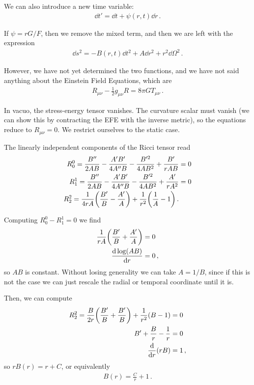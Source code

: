 \documentclass[main.tex]{subfiles}
\begin{document}
We can also introduce a new time variable: 
%
\begin{align}
\dd{t'} = \dd{t} + \psi (r, t) \dd{r} 
\,.
\end{align}

If \(\psi = r G / F\), then we remove the mixed term, and then we are left with the expression 
%
\begin{align}
\dd{s^2} = -B (r, t) \dd{t^2} + A \dd{r^2} + r^2 \dd{\Omega^2}
\,.
\end{align}

However, we have not yet determined the two functions, and we have not said anything about the Einstein Field Equations, which are 
%
\begin{align}
R_{\mu \nu } - \frac{1}{2} g_{\mu \nu } R = 8 \pi G T_{\mu \nu }
\,.
\end{align}

In vacuo, the stress-energy tensor vanishes. 
The curvature scalar must vanish (we can show this by contracting the EFE with the inverse metric), so the equations reduce to \(R_{\mu \nu } = 0\). 
We restrict ourselves to the static case. 

The linearly independent components of the Ricci tensor read 
%
\begin{align}
R_{0}^{0} = \frac{B''}{2AB} - \frac{A' B'}{4 A'' B}
- \frac{B^{\prime 2}}{4AB^2} + \frac{B'}{rAB} &= 0 \\
R_{1}^{1} = \frac{B''}{2AB} - \frac{A' B'}{4 A'' B}
- \frac{B^{\prime 2}}{4AB^2} + \frac{A'}{rA^2} &= 0 \\ 
R_{2}^{2} = \frac{1}{4rA} \qty(\frac{B'}{B} - \frac{A'}{A})
+ \frac{1}{r^2} \qty( \frac{1}{A} - 1)
\,.
\end{align}

Computing \(R^{0}_{0} - R^{1}_{1} = 0\) we find 
%
\begin{align}
\frac{1}{rA} \qty(\frac{B'}{B} + \frac{A'}{A} )&= 0  \\
\dv{\log (AB)}{r} &= 0
\,,
\end{align}
%
so \(AB\) is constant.
Without losing generality we can take \(A = 1/B\), since if this is not the case we can just rescale the radial or temporal coordinate until it is.

Then, we can compute 
%
\begin{align}
R^{2}_{2} = \frac{B}{2r} \qty(\frac{B'}{B} + \frac{B'}{B}) + \frac{1}{r^2} (B-1) &= 0  \\
B' + \frac{B}{r} - \frac{1}{r} &= 0  \\
\dv{}{r} \qty(rB) &= 1
\,,
\end{align}
%
so \(r B(r) = r + C\), or equivalently 
%
\begin{align}
B (r) = \frac{C}{r} + 1
\,.
\end{align}
\end{document}
